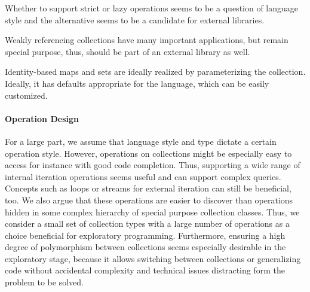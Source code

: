 \documentclass[sigconf, authorversion]{acmart}
\begin{document}
Whether to support strict or lazy operations seems
to be a question of language style
and the alternative seems to be a candidate for external libraries.

Weakly referencing collections have many important applications,
but remain special purpose, thus, should be part of an external library as well.

Identity-based maps and sets are ideally realized
by parameterizing the collection.
Ideally, it has defaults appropriate for the language,
which can be easily customized.

\paragraph{Operation Design}

For a large part,
we assume that language style and type dictate a certain operation style.
However, operations on collections might be especially easy to access
for instance with good code completion.
Thus, supporting a wide range of internal iteration operations seems useful
and can support complex queries.
Concepts such as loops or streams for external iteration
can still be beneficial, too.
We also argue that these operations are easier to discover
than operations hidden in some complex hierarchy
of special purpose collection classes.
Thus, we consider a small set of collection types
with a large number of operations
as a choice beneficial for exploratory programming.
%
Furthermore, ensuring a high degree of polymorphism between collections
seems especially desirable in the exploratory stage,
because it allows switching between collections or generalizing code
without accidental complexity and technical issues distracting form the problem to be solved.
\end{document}
